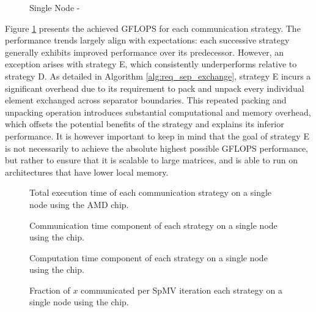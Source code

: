 \begin{figure}[H]
    \centering
    \caption{Single Node - }
    \label{fig:gflopsdefqsingle}
\end{figure}
Figure \ref{fig:gflopsdefqsingle} presents the achieved GFLOPS for each communication strategy. The performance trends largely align with expectations: each successive strategy generally exhibits improved performance over its predecessor. However, an exception arises with strategy E, which consistently underperforms relative to strategy D. As detailed in Algorithm \ref{alg:req_sep_exchange}, strategy E incurs a significant overhead due to its requirement to pack and unpack every individual element exchanged across separator boundaries. This repeated packing and unpacking operation introduces substantial computational and memory overhead, which offsets the potential benefits of the strategy and explains its inferior performance. It is however important to keep in mind that the goal of strategy E is not necessarily to achieve the absolute highest possible GFLOPS performance, but rather to ensure that it is scalable to large matrices, and is able to run on architectures that have lower local memory.
 
\begin{figure}[H]
    \centering
    \caption{Total execution time of each communication strategy on a single node using the AMD  chip.}
    \label{fig:tdefqsingle}
\end{figure}

\begin{figure}[H]
    \centering
    \caption{Communication time component of each strategy on a single node using the  chip.}
    \label{fig:tcommdefqsingle}
\end{figure}

\begin{figure}[H]
    \centering
    \caption{Computation time component of each strategy on a single node using the  chip.}
    \label{fig:tcompdefqsingle}
\end{figure}

\begin{figure}[H]
    \centering
    \caption{Fraction of \(x\) communicated per SpMV iteration each strategy on a single node using the  chip.}
    \label{fig:commloaddefqsingle}
\end{figure}
